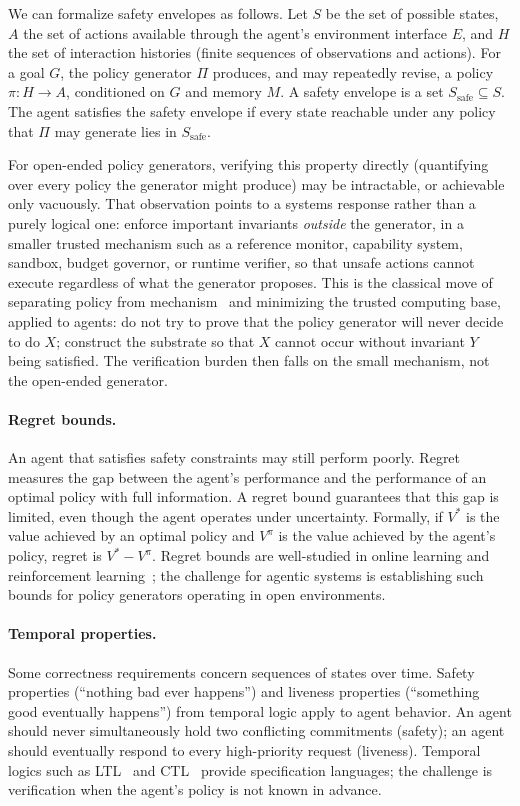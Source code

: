 \documentclass[11pt]{article}
\begin{document}
We can formalize safety envelopes as follows. Let $S$ be the set of possible states, $A$ the set of actions available through the agent's environment interface $E$, and $H$ the set of interaction histories (finite sequences of observations and actions). For a goal $G$, the policy generator $\Pi$ produces, and may repeatedly revise, a policy $\pi: H \rightarrow A$, conditioned on $G$ and memory $M$. A safety envelope is a set $S_{\text{safe}} \subseteq S$. The agent satisfies the safety envelope if every state reachable under any policy that $\Pi$ may generate lies in $S_{\text{safe}}$.

For open-ended policy generators, verifying this property directly (quantifying over every policy the generator might produce) may be intractable, or achievable only vacuously. That observation points to a systems response rather than a purely logical one: enforce important invariants \textit{outside} the generator, in a smaller trusted mechanism such as a reference monitor, capability system, sandbox, budget governor, or runtime verifier, so that unsafe actions cannot execute regardless of what the generator proposes. This is the classical move of separating policy from mechanism~\cite{levin_hydra} and minimizing the trusted computing base, applied to agents: do not try to prove that the policy generator will never decide to do $X$; construct the substrate so that $X$ cannot occur without invariant $Y$ being satisfied. The verification burden then falls on the small mechanism, not the open-ended generator.

\paragraph{Regret bounds.} An agent that satisfies safety constraints may still perform poorly. Regret measures the gap between the agent's performance and the performance of an optimal policy with full information. A regret bound guarantees that this gap is limited, even though the agent operates under uncertainty. Formally, if $V^*$ is the value achieved by an optimal policy and $V^\pi$ is the value achieved by the agent's policy, regret is $V^* - V^\pi$. Regret bounds are well-studied in online learning and reinforcement learning~\cite{cesa_bianchi_plg,jaksch_ucrl}; the challenge for agentic systems is establishing such bounds for policy generators operating in open environments.

\paragraph{Temporal properties.} Some correctness requirements concern sequences of states over time. Safety properties (``nothing bad ever happens'') and liveness properties (``something good eventually happens'') from temporal logic apply to agent behavior. An agent should never simultaneously hold two conflicting commitments (safety); an agent should eventually respond to every high-priority request (liveness). Temporal logics such as LTL~\cite{pnueli_ltl} and CTL~\cite{clarke_ctl} provide specification languages; the challenge is verification when the agent's policy is not known in advance.
\end{document}
